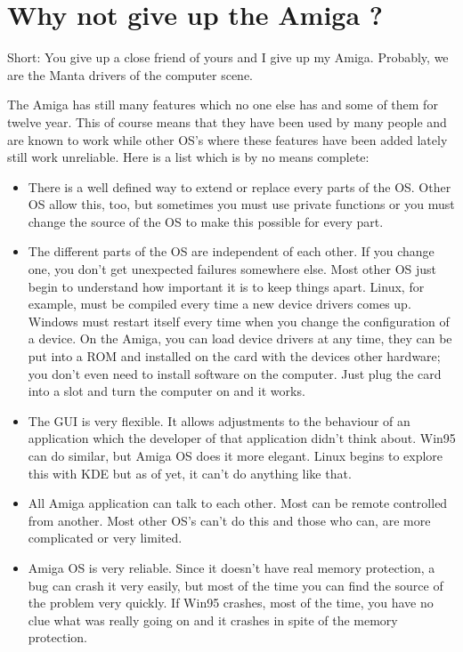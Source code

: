 \section{Why not give up the Amiga ?}

Short: You give up a close friend of yours and I give up my Amiga.
Probably, we are the Manta drivers of the computer scene.

The Amiga has still many features which no one else has and some of them
for twelve year. This of course means that they have been used by many
people and are known to work while other OS's where these features have been
added lately still work unreliable. Here is a list which is by no means
complete:

\begin{itemize}
\item There is a well defined way to extend or replace every parts of the OS.
Other OS allow this, too, but sometimes you must use private functions or
you must change the source of the OS to make this possible for every part.

\item The different parts of the OS are independent of each other.
If you change one, you don't get unexpected failures somewhere else.
Most other OS just begin to understand how important it is to keep
things apart. Linux, for example, must be compiled every time a new
device drivers comes up. Windows must restart itself every time when
you change the configuration of a device. On the Amiga, you can load
device drivers at any time, they can be put into a ROM and installed on the
card with the devices other hardware; you don't even need to install
software on the computer. Just plug the card into a slot and turn
the computer on and it works.

\item The GUI is very flexible. It allows adjustments to the behaviour of
an application which the developer of that application didn't think about.
Win95 can do similar, but Amiga OS does it more elegant. Linux begins to
explore this with KDE but as of yet, it can't do anything like that.

\item All Amiga application can talk to each other. Most can be remote
controlled from another. Most other OS's can't do this and those who can,
are more complicated or very limited.

\item Amiga OS is very reliable. Since it doesn't have real memory
protection, a bug can crash it very easily, but most of the time you can
find the source of the problem very quickly. If Win95 crashes, most of the
time, you have no clue what was really going on and it crashes in spite
of the memory protection.


\end{itemize}
